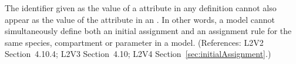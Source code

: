 The identifier given as the value of a 
attribute in any \InitialAssignment definition cannot also appear
as the value of the  attribute in an
\AssignmentRule.  In other words, a model cannot
simultaneously define both an initial assignment and an assignment rule for
the same species, compartment or parameter in a model.
(References: L2V2 Section~4.10.4; L2V3
Section~4.10; L2V4 Section~\ref{sec:initialAssignment}.)
